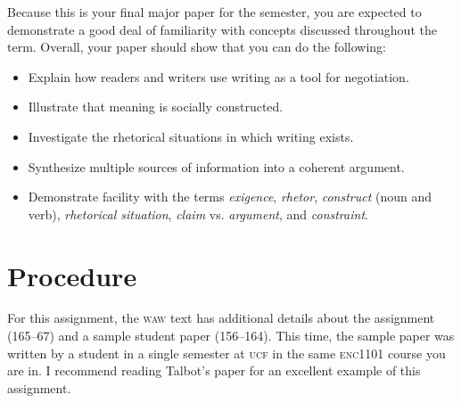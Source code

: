 \documentclass[10pt, twosides]{amsart}	%
\begin{document}
Because this is your final major paper for the semester, you are expected to demonstrate a good deal of familiarity with concepts discussed throughout the term. Overall, your paper should show that you can do the following:
\begin{itemize}
	\item Explain how readers and writers use writing as a tool for negotiation.
	\item Illustrate that meaning is socially constructed.
	\item Investigate the rhetorical situations in which writing exists.
	\item Synthesize multiple sources of information into a coherent argument.
	\item Demonstrate facility with the terms \emph{exigence}, \emph{rhetor}, \emph{construct} (noun and verb), \emph{rhetorical situation}, \emph{claim} vs. \emph{argument}, and \emph{constraint}.
\end{itemize}

\section{Procedure} %
\label{sec:procedure}
For this assignment, the \textsc{waw} text has additional details about the assignment (165–67) and a sample student paper (156–164). This time, the sample paper was written by a student in a single semester at \textsc{ucf} in the same \textsc{enc1101} course you are in. I recommend reading Talbot's paper for an excellent example of this assignment.
\end{document}
